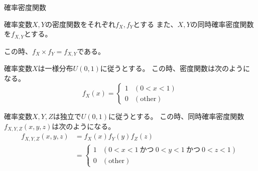 \documentclass[12pt,b5paper]{ltjsarticle}
\begin{document}
確率密度関数

\hrulefill

確率変数$X,Y$の密度関数をそれぞれ$f_X,f_Y$とする
また、$X,Y$の同時確率密度関数を$f_{X,Y}$とする。

この時、$f_X \times f_Y = f_{X,Y}$である。

\hrulefill

確率変数$X$は一様分布$U(0,1)$に従うとする。
この時、密度関数は次のようになる。
\begin{equation}
 f_X(x) = \begin{cases}1 & (0< x < 1)\\ 0 & (\text{other})\end{cases}
\end{equation}

確率変数$X,Y,Z$は独立で$U(0,1)$に従うとする。
この時、同時確率密度関数$f_{X,Y,Z}(x,y,z)$は次のようになる。
\begin{align}
 f_{X,Y,Z}(x,y,z) &= f_X(x)f_Y(y)f_Z(z)\\
 &=
 \begin{cases}
 1 & (0< x < 1 \ \text{かつ}\ 0< y < 1 \ \text{かつ}\ 0< z < 1)\\
 0 & (\text{other})
 \end{cases}
\end{align}
\end{document}
